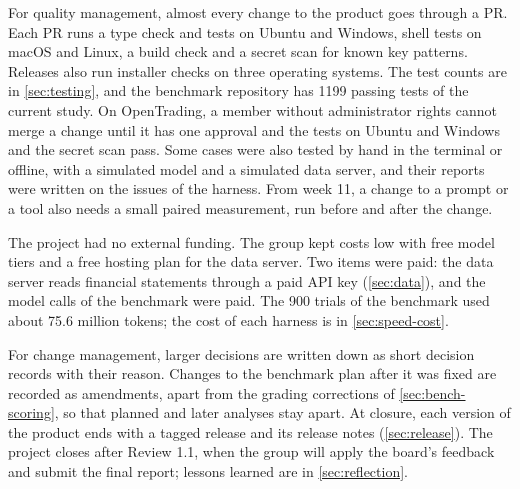 \label{sec:quality}
For quality management, almost every change to the product goes through a PR.
Each PR runs a type check and tests on Ubuntu and Windows, shell tests on macOS and Linux, a build check and a secret scan for known key patterns.
Releases also run installer checks on three operating systems.
The test counts are in \cref{sec:testing}, and the benchmark repository has \num{1199} passing tests of the current study.
On OpenTrading, a member without administrator rights cannot merge a change until it has one approval and the tests on Ubuntu and Windows and the secret scan pass.
Some cases were also tested by hand in the terminal or offline, with a simulated model and a simulated data server, and their reports were written on the issues of the harness.
From week 11, a change to a prompt or a tool also needs a small paired measurement, run before and after the change.

\label{sec:budget}
The project had no external funding.
The group kept costs low with free model tiers and a free hosting plan for the data server.
Two items were paid: the data server reads financial statements through a paid API key (\cref{sec:data}), and the model calls of the benchmark were paid.
The 900 trials of the benchmark used about 75.6 million tokens; the cost of each harness is in \cref{sec:speed-cost}.

\label{sec:change}
For change management, larger decisions are written down as short decision records with their reason.
Changes to the benchmark plan after it was fixed are recorded as amendments, apart from the grading corrections of \cref{sec:bench-scoring}, so that planned and later analyses stay apart.
\label{sec:closure}
At closure, each version of the product ends with a tagged release and its release notes (\cref{sec:release}).
The project closes after Review 1.1, when the group will apply the board's feedback and submit the final report; lessons learned are in \cref{sec:reflection}.
